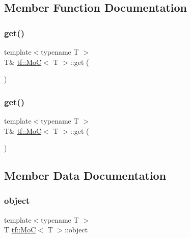 \subsection{Member Function Documentation}
\mbox{\label{structtf_1_1MoC_ab6291eb8f0d85484203bb79456ae9816}} 
\subsubsection{\texorpdfstring{get()}{get()}\hspace{0.1cm}{\footnotesize\ttfamily [1/2]}}
{\footnotesize\ttfamily template$<$typename T $>$ \\
T\& \hyperlink{structtf_1_1MoC}{tf\+::\+MoC}$<$ T $>$\+::get (\begin{DoxyParamCaption}{ }\end{DoxyParamCaption})\hspace{0.3cm}{\ttfamily [inline]}}

\mbox{\label{structtf_1_1MoC_ab6291eb8f0d85484203bb79456ae9816}} 
\subsubsection{\texorpdfstring{get()}{get()}\hspace{0.1cm}{\footnotesize\ttfamily [2/2]}}
{\footnotesize\ttfamily template$<$typename T $>$ \\
T\& \hyperlink{structtf_1_1MoC}{tf\+::\+MoC}$<$ T $>$\+::get (\begin{DoxyParamCaption}{ }\end{DoxyParamCaption})\hspace{0.3cm}{\ttfamily [inline]}}



\subsection{Member Data Documentation}
\mbox{\label{structtf_1_1MoC_a6638e1dc2bd032df12bb48584eabe71e}} 
\subsubsection{\texorpdfstring{object}{object}}
{\footnotesize\ttfamily template$<$typename T $>$ \\
T \hyperlink{structtf_1_1MoC}{tf\+::\+MoC}$<$ T $>$\+::object\hspace{0.3cm}{\ttfamily [mutable]}}




